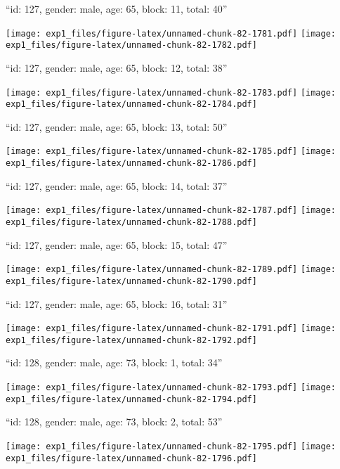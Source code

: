 \documentclass[11pt,,]{article}
\begin{document}
\newpage
[1] 

``id: 127, gender: male, age: 65, block: 11, total: 40''

\texttt{[image: exp1\_files/figure-latex/unnamed-chunk-82-1781.pdf]}
\texttt{[image: exp1\_files/figure-latex/unnamed-chunk-82-1782.pdf]}

\newpage
[1] 

``id: 127, gender: male, age: 65, block: 12, total: 38''

\texttt{[image: exp1\_files/figure-latex/unnamed-chunk-82-1783.pdf]}
\texttt{[image: exp1\_files/figure-latex/unnamed-chunk-82-1784.pdf]}

\newpage
[1] 

``id: 127, gender: male, age: 65, block: 13, total: 50''

\texttt{[image: exp1\_files/figure-latex/unnamed-chunk-82-1785.pdf]}
\texttt{[image: exp1\_files/figure-latex/unnamed-chunk-82-1786.pdf]}

\newpage
[1] 

``id: 127, gender: male, age: 65, block: 14, total: 37''

\texttt{[image: exp1\_files/figure-latex/unnamed-chunk-82-1787.pdf]}
\texttt{[image: exp1\_files/figure-latex/unnamed-chunk-82-1788.pdf]}

\newpage
[1] 

``id: 127, gender: male, age: 65, block: 15, total: 47''

\texttt{[image: exp1\_files/figure-latex/unnamed-chunk-82-1789.pdf]}
\texttt{[image: exp1\_files/figure-latex/unnamed-chunk-82-1790.pdf]}

\newpage
[1] 

``id: 127, gender: male, age: 65, block: 16, total: 31''

\texttt{[image: exp1\_files/figure-latex/unnamed-chunk-82-1791.pdf]}
\texttt{[image: exp1\_files/figure-latex/unnamed-chunk-82-1792.pdf]}

\newpage
[1] 

``id: 128, gender: male, age: 73, block: 1, total: 34''

\texttt{[image: exp1\_files/figure-latex/unnamed-chunk-82-1793.pdf]}
\texttt{[image: exp1\_files/figure-latex/unnamed-chunk-82-1794.pdf]}

\newpage
[1] 

``id: 128, gender: male, age: 73, block: 2, total: 53''

\texttt{[image: exp1\_files/figure-latex/unnamed-chunk-82-1795.pdf]}
\texttt{[image: exp1\_files/figure-latex/unnamed-chunk-82-1796.pdf]}
\end{document}
